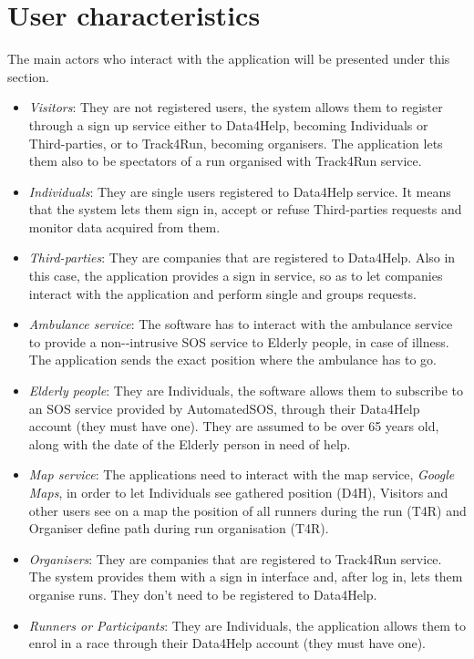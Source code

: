 \section{User characteristics}

The main actors who interact with the application will be presented under this section. 

\begin{itemize}
    \item \emph{Visitors}: They are not registered users, the system allows them to register through a sign up service either to Data4Help, becoming Individuals or Third-parties, or to Track4Run, becoming organisers. The application lets them also to be spectators of a run organised with Track4Run service. 
    \item \emph{Individuals}: They are single users registered to Data4Help service. It means that the system lets them sign in, accept or refuse Third-parties requests and monitor data acquired from them.
    \item \emph{Third-parties}: They are companies that are registered to Data4Help. Also in this case, the application provides a sign in service, so as to let companies interact with the application and perform single and groups requests. 
    \item \emph{Ambulance service}: The software has to interact with the ambulance service  to provide a non-‐intrusive SOS service to Elderly people, in case of illness. The application sends the exact position where the ambulance has to go.  
    \item \emph{Elderly people}: They are Individuals, the software allows them to subscribe to an SOS service provided by AutomatedSOS, through their Data4Help account (they must have one). They are assumed to be over 65 years old, along with the date of the Elderly person in need of help.
    \item \emph{Map service}: The applications need to interact with the map service, \emph{Google Maps}, in order to let Individuals see gathered position (D4H),  Visitors and other users see on a map the position of all runners during the run (T4R) and Organiser define path during run organisation (T4R).
    \item \emph{Organisers}: They are companies that are registered to Track4Run service. The system provides them with a sign in interface and, after log in, lets them organise runs. They don't need to be registered to Data4Help.
    \item \emph{Runners or Participants}: They are Individuals, the application allows them to enrol in a race through their Data4Help account (they must have one).
\end{itemize}
